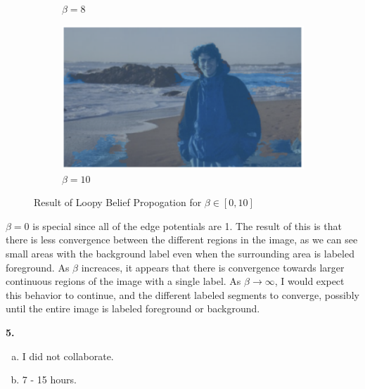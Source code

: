 \documentclass{article}
\begin{document}
\begin{enumerate}[(a)]
\begin{figure}[H]
\begin{subfigure}[b]{0.3\textwidth}
        \caption{$\beta = 8$}
    \end{subfigure}
    \hfill
    \begin{subfigure}[b]{0.3\textwidth}
        \centering
        \includegraphics[width=\textwidth]{beta10.png}
        \caption{$\beta = 10$}
    \end{subfigure}
    \caption{Result of Loopy Belief Propogation for $\beta \in [0, 10]$}
    \label{fig:grid_of_images}
\end{figure}
$\beta = 0$ is special since all of the edge potentials are 1. The result of this is that there is less convergence between the different regions in the image, as we can see small areas with the background label even when the surrounding area is labeled foreground. As $\beta$ increaces, it appears that there is convergence towards larger continuous regions of the image with a single label. As $\beta \rightarrow \infty$, I would expect this behavior to continue, and the different labeled segments to converge, possibly until the entire image is labeled foreground or background.  
\end{enumerate}
\textbf{5.} \begin{enumerate}[(a)]
    \item I did not collaborate.
    \item 7 - 15 hours. 
\end{enumerate}
\end{document}
